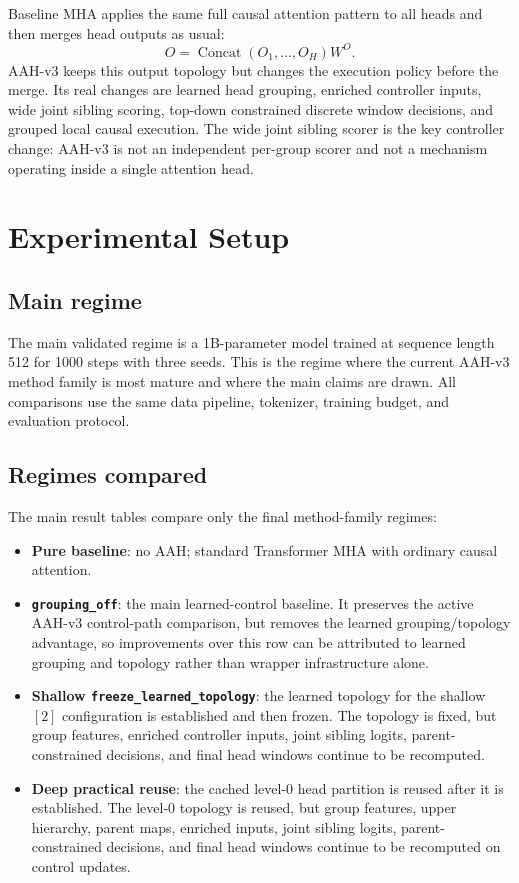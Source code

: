 \documentclass[11pt]{article}
\begin{document}
Baseline MHA applies the same full causal attention pattern to all heads and then merges head outputs as usual:
\[
  O=\operatorname{Concat}(O_1,\dots,O_H)W^O.
\]
AAH-v3 keeps this output topology but changes the execution policy before the merge. Its real changes are learned head grouping, enriched controller inputs, wide joint sibling scoring, top-down constrained discrete window decisions, and grouped local causal execution. The wide joint sibling scorer is the key controller change: AAH-v3 is not an independent per-group scorer and not a mechanism operating inside a single attention head.
\section{Experimental Setup}

\subsection{Main regime}

The main validated regime is a 1B-parameter model trained at sequence length 512 for 1000 steps with three seeds. This is the regime where the current AAH-v3 method family is most mature and where the main claims are drawn. All comparisons use the same data pipeline, tokenizer, training budget, and evaluation protocol.

\subsection{Regimes compared}

The main result tables compare only the final method-family regimes:
\begin{itemize}
  \item \textbf{Pure baseline}: no AAH; standard Transformer MHA with ordinary causal attention.
  \item \textbf{\texttt{grouping\_off}}: the main learned-control baseline. It preserves the active AAH-v3 control-path comparison, but removes the learned grouping/topology advantage, so improvements over this row can be attributed to learned grouping and topology rather than wrapper infrastructure alone.
  \item \textbf{Shallow \texttt{freeze\_learned\_topology}}: the learned topology for the shallow \([2]\) configuration is established and then frozen. The topology is fixed, but group features, enriched controller inputs, joint sibling logits, parent-constrained decisions, and final head windows continue to be recomputed.
  \item \textbf{Deep practical reuse}: the cached level-0 head partition is reused after it is established. The level-0 topology is reused, but group features, upper hierarchy, parent maps, enriched inputs, joint sibling logits, parent-constrained decisions, and final head windows continue to be recomputed on control updates.
\end{itemize}
\end{document}
